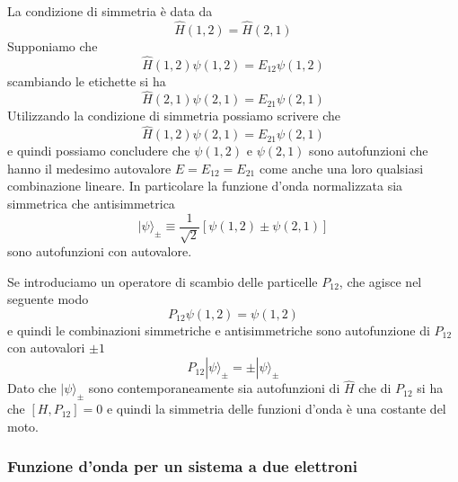 La condizione di simmetria \`e data da
\begin{equation*}
	\hat{H}(1,2) = \hat{H}(2,1)
\end{equation*}
Supponiamo che 
\begin{equation*}
	\hat{H}(1,2) \psi (1,2) =E_{12} \psi(1,2)
\end{equation*}
scambiando le etichette si ha 
\begin{equation*}
	\hat{H}(2,1)\psi(2,1) = E_{21}\psi(2,1)
\end{equation*}
Utilizzando la condizione di simmetria possiamo scrivere che 
\begin{equation*}
	\hat{H}(1,2)\psi(2,1) = E_{21} \psi(2,1)
\end{equation*}
e quindi possiamo concludere che $\psi(1,2)$ e $\psi(2,1)$ sono autofunzioni che hanno il medesimo autovalore 
$E = E_{12} = E_{21}$ come anche una loro qualsiasi combinazione lineare. In particolare la funzione d'onda normalizzata sia simmetrica che antisimmetrica 
\begin{equation*}
	|\psi \rangle_{\pm} \equiv \frac{1}{\sqrt{2}}[\psi(1,2) \pm \psi(2,1)] 
\end{equation*}
sono autofunzioni con autovalore.

Se introduciamo un operatore di scambio delle particelle $P_{12}$, che agisce nel seguente modo
\begin{equation*}
	P_{12}\psi(1,2) = \psi(1,2)
\end{equation*}
e quindi le combinazioni simmetriche e antisimmetriche sono autofunzione di $P_{12}$ con autovalori $\pm 1$
\begin{equation*}
	P_{12}|\psi \rangle_{\pm} = \pm |\psi \rangle_{\pm}
\end{equation*}
Dato che $|\psi \rangle_{\pm}$ sono contemporaneamente sia autofunzioni di $\hat{H}$ che di $P_{12}$ si ha che $[H,P_{12}] = 0$ e quindi la simmetria delle funzioni d'onda \`e una costante del moto.

\subsubsection{Funzione d'onda per un sistema a due elettroni}

